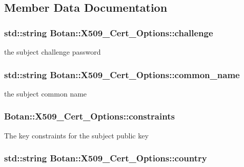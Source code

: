 \subsection{Member Data Documentation}
\hypertarget{classBotan_1_1X509__Cert__Options_ad47945c06aa8d14b21404a22a0d8ed95}{
\subsubsection[{challenge}]{\setlength{\rightskip}{0pt plus 5cm}std\-::string Botan\-::\-X509\-\_\-\-Cert\-\_\-\-Options\-::challenge}}\label{classBotan_1_1X509__Cert__Options_ad47945c06aa8d14b21404a22a0d8ed95}
the subject challenge password \hypertarget{classBotan_1_1X509__Cert__Options_a02141950aee189043d3573f7ebe24d1f}{
\subsubsection[{common\-\_\-name}]{\setlength{\rightskip}{0pt plus 5cm}std\-::string Botan\-::\-X509\-\_\-\-Cert\-\_\-\-Options\-::common\-\_\-name}}\label{classBotan_1_1X509__Cert__Options_a02141950aee189043d3573f7ebe24d1f}
the subject common name \hypertarget{classBotan_1_1X509__Cert__Options_a26969d11dbf75cba4445fd7f772b7c04}{
\subsubsection[{constraints}]{ Botan\-::\-X509\-\_\-\-Cert\-\_\-\-Options\-::constraints}}\label{classBotan_1_1X509__Cert__Options_a26969d11dbf75cba4445fd7f772b7c04}
The key constraints for the subject public key \hypertarget{classBotan_1_1X509__Cert__Options_a5b033afb6618ae36bf0929cc1412a02a}{
\subsubsection[{country}]{\setlength{\rightskip}{0pt plus 5cm}std\-::string Botan\-::\-X509\-\_\-\-Cert\-\_\-\-Options\-::country}}\label{classBotan_1_1X509__Cert__Options_a5b033afb6618ae36bf0929cc1412a02a}
